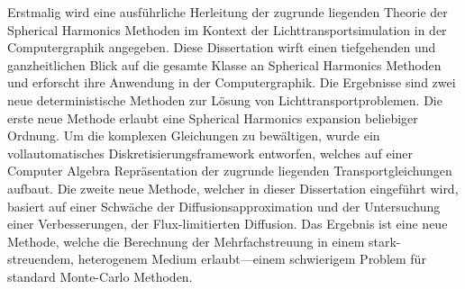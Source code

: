 Erstmalig wird eine ausführliche Herleitung der zugrunde liegenden Theorie der Spherical Harmonics Methoden im Kontext der Lichttransportsimulation in der Computergraphik angegeben. Diese Dissertation wirft einen tiefgehenden und ganzheitlichen Blick auf die gesamte Klasse an Spherical Harmonics Methoden und erforscht ihre Anwendung in der Computergraphik. Die Ergebnisse sind zwei neue deterministische Methoden zur Lösung von Lichttransportproblemen. Die erste neue Methode erlaubt eine Spherical Harmonics expansion beliebiger Ordnung. Um die komplexen Gleichungen zu bewältigen, wurde ein vollautomatisches Diskretisierungsframework entworfen, welches auf einer Computer Algebra Repräsentation der zugrunde liegenden Transportgleichungen aufbaut. Die zweite neue Methode, welcher in dieser Dissertation eingeführt wird, basiert auf einer Schwäche der Diffusionsapproximation und der Untersuchung einer Verbesserungen, der Flux-limitierten Diffusion. Das Ergebnis ist eine neue Methode, welche die Berechnung der Mehrfachstreuung in einem stark-streuendem, heterogenem Medium erlaubt---einem schwierigem Problem für standard Monte-Carlo Methoden.
%

